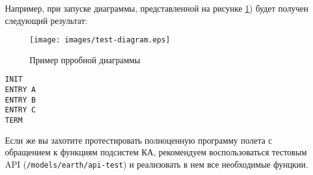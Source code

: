 \documentclass[12pt,a4paper]{article}
\begin{document}
Например, при запуске диаграммы, представленной на рисунке \ref{Pic:TestDiagr}) будет получен следующий результат:

\begin{figure}[tbh]
  \begin{center}
    \texttt{[image: images/test-diagram.eps]}
    \caption{Пример прробной диаграммы}
    \label{Pic:TestDiagr}
  \end{center}
\end{figure}

\begin{verbatim}
INIT
ENTRY A
ENTRY B
ENTRY C
TERM
\end{verbatim}

Если же вы захотите протестировать полноценную программу полета с обращением к функциям
подсистем КА, рекомендуем воспользоваться тестовым API (\verb'/models/earth/api-test') и
реализовать в нем все необходимые фунцкии.
\end{document}
